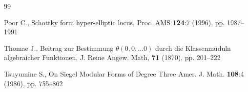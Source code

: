\documentclass[twoside]{amsart}
\theoremstyle{definition}
\theoremstyle{plain}
\begin{document}
\begin{thebibliography}{99}

  Poor C., Schottky form hyper-elliptic locus, Proc. AMS \textbf{124}:7 (1996),
pp. 1987--1991

 

 Thomae J., Beitrag zur Bestimmung
 $\theta (0, 0, ... 0)$ durch die Klassenmuduln algebraicher Funktionen,
J. Reine Angew. Math, \textbf{71} (1870), pp. 201--222

 Tsuyumine S.,  On Siegel Modular Forms of Degree Three
Amer. J. Math. \textbf{108}:4 (1986), pp. 755--862

\end{thebibliography}
\end{document}
